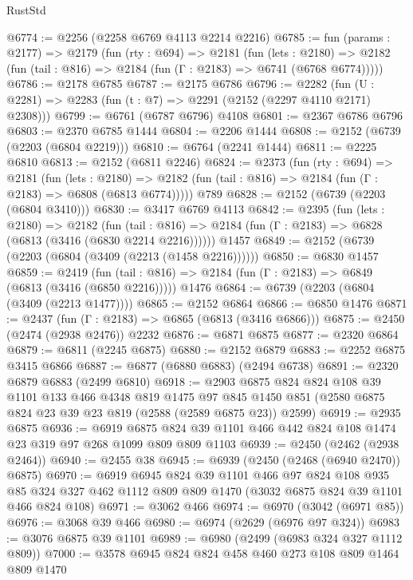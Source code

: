 \begin{lexlean}{RustStd}
\begin{coremodule}
@6774 := @2256 (@2258 @6769 @4113 @2214 @2216)
@6785 := fun (params : @2177) =>
  @2179
    (fun (rty : @694) =>
    @2181
      (fun (lets : @2180) =>
      @2182 (fun (tail : @816) => @2184 (fun (Γ : @2183) => @6741 (@6768 @6774)))))
@6786 := @2178 @6785
@6787 := @2175 @6786
@6796 := @2282 (fun (U : @2281) => @2283 (fun (t : @7) => @2291 (@2152 (@2297 @4110 @2171) @2308)))
@6799 := @6761 (@6787 @6796) @4108
@6801 := @2367 @6786 @6796
@6803 := @2370 @6785 @1444
@6804 := @2206 @1444
@6808 := @2152 (@6739 (@2203 (@6804 @2219)))
@6810 := @6764 (@2241 @1444)
@6811 := @2225 @6810
@6813 := @2152 (@6811 @2246)
@6824 := @2373
    (fun (rty : @694) =>
    @2181
      (fun (lets : @2180) =>
      @2182 (fun (tail : @816) => @2184 (fun (Γ : @2183) => @6808 (@6813 @6774)))))
    @789
@6828 := @2152 (@6739 (@2203 (@6804 @3410)))
@6830 := @3417 @6769 @4113
@6842 := @2395
    (fun (lets : @2180) =>
    @2182
      (fun (tail : @816) => @2184 (fun (Γ : @2183) => @6828 (@6813 (@3416 (@6830 @2214 @2216))))))
    @1457
@6849 := @2152 (@6739 (@2203 (@6804 (@3409 (@2213 (@1458 @2216))))))
@6850 := @6830 @1457
@6859 := @2419
    (fun (tail : @816) => @2184 (fun (Γ : @2183) => @6849 (@6813 (@3416 (@6850 @2216)))))
    @1476
@6864 := @6739 (@2203 (@6804 (@3409 (@2213 @1477))))
@6865 := @2152 @6864
@6866 := @6850 @1476
@6871 := @2437 (fun (Γ : @2183) => @6865 (@6813 (@3416 @6866)))
@6875 := @2450 (@2474 (@2938 @2476)) @2232
@6876 := @6871 @6875
@6877 := @2320 @6864
@6879 := @6811 (@2245 @6875)
@6880 := @2152 @6879
@6883 := @2252 @6875 @3415 @6866
@6887 := @6877 (@6880 @6883) (@2494 @6738)
@6891 := @2320 @6879 @6883 (@2499 @6810)
@6918 := @2903
    @6875
    @824
    @824
    @108
    @39
    @1101
    @133
    @466
    @4348
    @819
    @1475
    @97
    @845
    @1450
    @851
    (@2580 @6875 @824 @23 @39 @23 @819 (@2588 (@2589 @6875 @23)) @2599)
@6919 := @2935 @6875
@6936 := @6919
    @6875
    @824
    @39
    @1101
    @466
    @442
    @824
    @108
    @1474
    @23
    @319
    @97
    @268
    @1099
    @809
    @809
    @1103
@6939 := @2450 (@2462 (@2938 @2464))
@6940 := @2455 @38
@6945 := @6939 (@2450 (@2468 (@6940 @2470)) @6875)
@6970 := @6919
    @6945
    @824
    @39
    @1101
    @466
    @97
    @824
    @108
    @935
    @85
    @324
    @327
    @462
    @1112
    @809
    @809
    @1470
    (@3032 @6875 @824 @39 @1101 @466 @824 @108)
@6971 := @3062 @466
@6974 := @6970 (@3042 (@6971 @85))
@6976 := @3068 @39 @466
@6980 := @6974 (@2629 (@6976 @97 @324))
@6983 := @3076 @6875 @39 @1101
@6989 := @6980 (@2499 (@6983 @324 @327 @1112 @809))
@7000 := @3578 @6945 @824 @824 @458 @460 @273 @108 @809 @1464 @809 @1470

\end{coremodule}
\end{lexlean}
